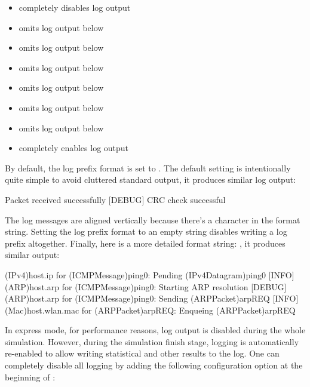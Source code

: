 \begin{itemize}
  \item {} completely disables log output
  \item {} omits log output below 
  \item {} omits log output below 
  \item {} omits log output below 
  \item {} omits log output below 
  \item {} omits log output below 
  \item {} omits log output below 
  \item {} completely enables log output
\end{itemize}

By default, the log prefix format is set to . The
default setting is intentionally quite simple to avoid cluttered standard output,
it produces similar log output:

\begin{filelisting}
[INFO]  Packet received successfully
[DEBUG] CRC check successful
\end{filelisting}

The log messages are aligned vertically because there's a  character
in the format string. Setting the log prefix format to an empty string disables
writing a log prefix altogether. Finally, here is a more detailed format string:
, it produces similar output:

\begin{filelisting}
[INFO]  (IPv4)host.ip for (ICMPMessage)ping0:     Pending (IPv4Datagram)ping0
[INFO]  (ARP)host.arp for (ICMPMessage)ping0:     Starting ARP resolution
[DEBUG] (ARP)host.arp for (ICMPMessage)ping0:     Sending (ARPPacket)arpREQ
[INFO]  (Mac)host.wlan.mac for (ARPPacket)arpREQ: Enqueing (ARPPacket)arpREQ
\end{filelisting}

In express mode, for performance reasons, log output is disabled during the whole
simulation. However, during the simulation finish stage, logging is automatically
re-enabled to allow writing statistical and other results to the log. One can
completely disable all logging by adding the following configuration option at the
beginning of :


